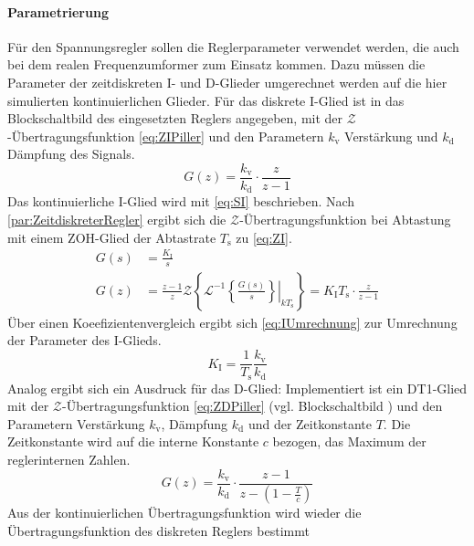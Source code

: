\paragraph{Parametrierung} Für den Spannungsregler sollen die Reglerparameter verwendet werden, die auch bei dem realen Frequenzumformer zum Einsatz kommen. Dazu müssen die Parameter der zeitdiskreten I- und D-Glieder umgerechnet werden auf die hier simulierten kontinuierlichen Glieder. Für das diskrete I-Glied ist in \cite{pillerpowersystemsPILLERUniversityRegelungstechnik} das Blockschaltbild des eingesetzten Reglers angegeben, mit der $\mathcal{Z}$-Übertragungsfunktion \cref{eq:ZIPiller} und den Parametern $k_\mathrm{v}$ Verstärkung und $k_\mathrm{d}$ Dämpfung des Signals.
\begin{equation}
	\label{eq:ZIPiller}
	G(z) = \frac{k_\mathrm{v}}{k_\mathrm{d}}\cdot\frac{z}{z-1}
\end{equation}
Das kontinuierliche I-Glied wird mit \cref{eq:SI} beschrieben. Nach \cref{par:ZeitdiskreterRegler} ergibt sich die $\mathcal{Z}$-Übertragungsfunktion bei Abtastung mit einem ZOH-Glied der Abtastrate $T_\mathrm{s}$ zu \cref{eq:ZI}.
\begin{align}
	G(s) &= \frac{K_\mathrm{I}}{s} \label{eq:SI}\\
	G(z) &= \frac{z-1}{z} \mathcal{Z}\left\{ \mathcal{L}^{-1}\left.\left\{\frac{G(s)}{s}\right\}\right|_{kT_{\mathrm{s}}} \right\} = K_\mathrm{I}T_\mathrm{s}\cdot\frac{z}{z-1} \label{eq:ZI}
\end{align}
Über einen Koeefizientenvergleich ergibt sich \cref{eq:IUmrechnung} zur Umrechnung der Parameter des I-Glieds.
\begin{equation}
	K_\mathrm{I} = \frac{1}{T_\mathrm{s}}\frac{k_\mathrm{v}}{k_\mathrm{d}}\label{eq:IUmrechnung}
\end{equation}
Analog ergibt sich ein Ausdruck für das D-Glied: Implementiert ist ein DT1-Glied mit der $\mathcal{Z}$-Übertragungsfunktion \cref{eq:ZDPiller} (vgl. Blockschaltbild \cite{pillerpowersystemsPILLERUniversityRegelungstechnik}) und den Parametern Verstärkung $k_\mathrm{v}$, Dämpfung $k_\mathrm{d}$ und der Zeitkonstante $T$. Die Zeitkonstante wird auf die interne Konstante $c$ bezogen, das Maximum der reglerinternen Zahlen.
\begin{equation}
	G(z) = \frac{k_\mathrm{v}}{k_\mathrm{d}}\cdot\frac{z-1}{z-(1-\frac{T}{c})}\label{eq:ZDPiller}
\end{equation}
Aus der kontinuierlichen Übertragungsfunktion wird wieder die Übertragungsfunktion des diskreten Reglers bestimmt 

